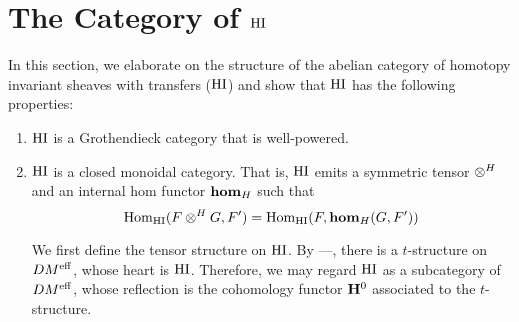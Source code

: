 \section{The Category of $\mathrm{HI}$}

In this section, we elaborate on the structure of the abelian
category of homotopy invariant sheaves with transfers ($\mathrm{HI}$) and 
show that $\mathrm{HI}$ has the following properties:

\begin{enumerate}

\item $\mathrm{HI}$ is a Grothendieck category that is well-powered.

\item $\mathrm{HI}$ is a closed monoidal category. That is, $\mathrm{HI}$ 
emits a symmetric tensor $\otimes^H$ and an internal hom
functor $\mathbf{hom}_H$ such that
\[
\mathrm{Hom}_{\mathrm{HI}}(F \otimes^H G, F') = \mathrm{Hom}_{\mathrm{HI}}(F, \mathbf{hom}_H(G, F'))
\]

We first define the tensor structure on $\mathrm{HI}$. By ---, there
is a $t$-structure on $DM^{\mathrm{eff}}$, whose heart is $\mathrm{HI}$. Therefore, 
we may regard $\mathrm{HI}$ as a subcategory of $DM^{\mathrm{eff}}$, whose 
reflection is the cohomology functor $\mathbf{H}^0$ associated to the
$t$-structure.
\end{enumerate}
